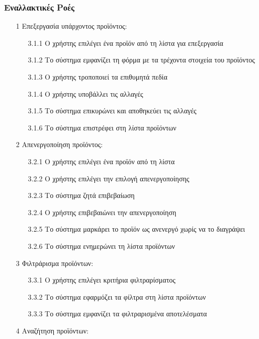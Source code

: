 \documentclass[12pt,a4paper,twoside]{book}
\begin{document}
\subsubsection{Εναλλακτικές Ροές}
\begin{enumerate}
  \item[1 ] Επεξεργασία υπάρχοντος προϊόντος:
        \begin{enumerate}
          \item[3.1.1 ] Ο χρήστης επιλέγει ένα προϊόν από τη λίστα για επεξεργασία
          \item[3.1.2 ] Το σύστημα εμφανίζει τη φόρμα με τα τρέχοντα στοιχεία του προϊόντος
          \item[3.1.3 ] Ο χρήστης τροποποιεί τα επιθυμητά πεδία
          \item[3.1.4 ] Ο χρήστης υποβάλλει τις αλλαγές
          \item[3.1.5 ] Το σύστημα επικυρώνει και αποθηκεύει τις αλλαγές
          \item[3.1.6 ] Το σύστημα επιστρέφει στη λίστα προϊόντων
        \end{enumerate}
  \item[2 ] Απενεργοποίηση προϊόντος:
        \begin{enumerate}
          \item [3.2.1 ] Ο χρήστης επιλέγει ένα προϊόν από τη λίστα
          \item [3.2.2 ] Ο χρήστης επιλέγει την επιλογή απενεργοποίησης
          \item [3.2.3 ] Το σύστημα ζητά επιβεβαίωση
          \item [3.2.4 ] Ο χρήστης επιβεβαιώνει την απενεργοποίηση
          \item [3.2.5 ] Το σύστημα μαρκάρει το προϊόν ως ανενεργό χωρίς να το διαγράψει
          \item [3.2.6 ] Το σύστημα ενημερώνει τη λίστα προϊόντων
        \end{enumerate}
  \item[3 ] Φιλτράρισμα προϊόντων:
        \begin{enumerate}
          \item [3.3.1 ] Ο χρήστης επιλέγει κριτήρια φιλτραρίσματος %
          \item [3.3.2 ] Το σύστημα εφαρμόζει τα φίλτρα στη λίστα προϊόντων
          \item [3.3.3 ] Το σύστημα εμφανίζει τα φιλτραρισμένα αποτελέσματα
        \end{enumerate}
  \item[4 ] Αναζήτηση προϊόντων:

\end{enumerate}
\end{document}
